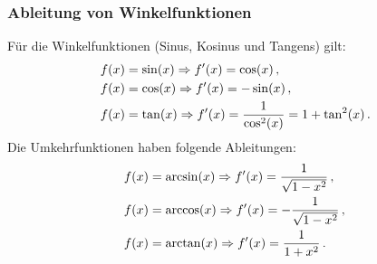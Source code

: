 \subsubsection{Ableitung von Winkelfunktionen}
Für die Winkelfunktionen (Sinus, Kosinus und Tangens) gilt:
\begin{align*}
    f(x) &= \sin(x) \Rightarrow f'(x) = \cos(x)\,{,}\, \\
    f(x) &= \cos(x) \Rightarrow f'(x) = -\sin(x)\,{,}\, \\
    f(x) &= \tan(x) \Rightarrow f'(x) = \frac{1}{\cos^2(x)} = 1 + \tan^2(x)\,.
\end{align*}
Die Umkehrfunktionen haben folgende Ableitungen:
\begin{align*}
    f(x) &= \arcsin(x) \Rightarrow f'(x) = \frac{1}{\sqrt{1-x^2}}\,{,}\, \\
    f(x) &= \arccos(x) \Rightarrow f'(x) = -\frac{1}{\sqrt{1-x^2}}\,{,}\, \\
    f(x) &= \arctan(x) \Rightarrow f'(x) = \frac{1}{1+x^2}\,.
\end{align*}

